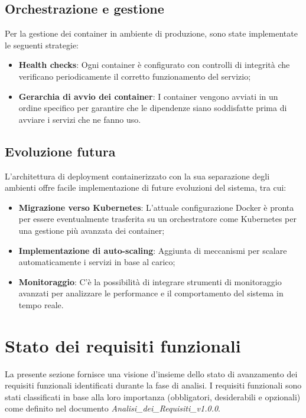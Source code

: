 \documentclass[10pt]{article}
\begin{document}
\subsection{Orchestrazione e gestione}
Per la gestione dei container in ambiente di produzione, sono state implementate le seguenti strategie:

\begin{itemize}
    \item \textbf{Health checks}: Ogni container è configurato con controlli di integrità che verificano periodicamente il corretto funzionamento del servizio;
    \item \textbf{Gerarchia di avvio dei container}: I container vengono avviati in un ordine specifico per garantire che le dipendenze siano soddisfatte prima di avviare i servizi che ne fanno uso.
\end{itemize}

\subsection{Evoluzione futura}
L'architettura di deployment containerizzato con la sua separazione degli ambienti offre facile implementazione di future evoluzioni del sistema, tra cui:

\begin{itemize}
    \item \textbf{Migrazione verso Kubernetes}: L'attuale configurazione Docker è pronta per essere eventualmente trasferita su un orchestratore come Kubernetes per una gestione più avanzata dei container;
    \item \textbf{Implementazione di auto-scaling}: Aggiunta di meccanismi per scalare automaticamente i servizi in base al carico;
    \item \textbf{Monitoraggio}: C'è la possibilità di integrare strumenti di monitoraggio avanzati per analizzare le performance e il comportamento del sistema in tempo reale.
\end{itemize}

\newpage

\section{Stato dei requisiti funzionali}

La presente sezione fornisce una visione d'insieme dello stato di avanzamento dei requisiti funzionali identificati durante la fase di analisi. I requisiti funzionali sono stati classificati in base alla loro importanza (obbligatori, desiderabili e opzionali) come definito nel documento \textit{Analisi\_dei\_Requisiti\_v1.0.0}.
\end{document}
